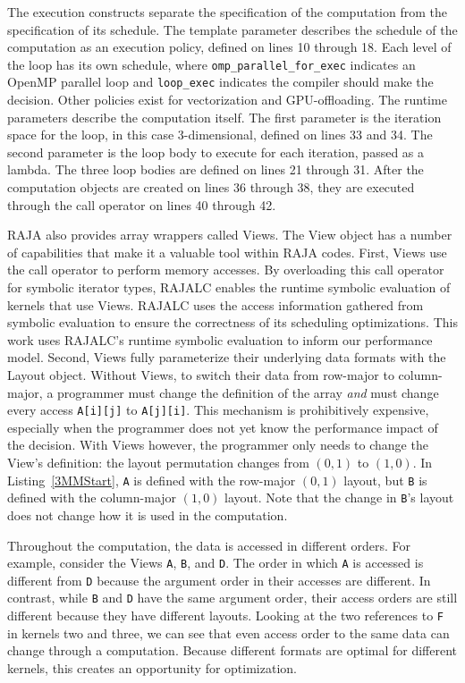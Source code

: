 \documentclass[sigconf,review=true]{acmart}
\begin{document}
The execution constructs separate the specification of the computation from the specification of its schedule.
The template parameter describes the schedule of the computation as an execution policy, defined on lines 10 through 18.
Each level of the loop has its own schedule, where \verb.omp_parallel_for_exec. indicates an OpenMP parallel loop and \verb.loop_exec. indicates the compiler should make the decision.
Other policies exist for vectorization and GPU-offloading.
The runtime parameters describe the computation itself. 
The first parameter is the iteration space for the loop, in this case 3-dimensional, defined on lines 33 and 34. 
The second parameter is the loop body to execute for each iteration, passed as a lambda.
The three loop bodies are defined on lines 21 through 31.
After the computation objects are created on lines 36 through 38, they are executed through the call operator on lines 40 through 42.

RAJA also provides array wrappers called Views.
The View object has a number of capabilities that make it a valuable tool within RAJA codes.
First, Views use the call operator to perform memory accesses. 
By overloading this call operator for symbolic iterator types, RAJALC enables the runtime symbolic evaluation of kernels that use Views.
RAJALC uses the access information gathered from symbolic evaluation to ensure the correctness of its scheduling optimizations.
This work uses RAJALC's runtime symbolic evaluation to inform our performance model.
Second, Views fully parameterize their underlying data formats with the Layout object.
Without Views, to switch their data from row-major to column-major, a programmer must change the definition of the array \textit{and} must change every access \verb.A[i][j]. to \verb.A[j][i]..
This mechanism is prohibitively expensive, especially when the programmer does not yet know the performance impact of the decision.
With Views however, the programmer only needs to change the View's definition: the layout permutation changes from $(0,1)$ to $(1,0)$. 
In Listing~\ref{3MMStart}, \verb.A. is defined with the row-major $(0,1)$ layout, but \verb.B. is defined with the column-major $(1,0)$ layout. 
Note that the change in \verb.B.'s layout does not change how it is used in the computation. 

Throughout the computation, the data is accessed in different orders.
For example, consider the Views \verb.A., \verb.B., and \verb.D..
The order in which \verb.A. is accessed is different from \verb.D. because the argument order in their accesses are different.
In contrast, while \verb.B. and \verb.D. have the same argument order, their access orders are still different because they have different layouts.
Looking at the two references to \verb.F. in kernels two and three, we can see that even access order to the same data can change through a computation.
Because different formats are optimal for different kernels, this creates an opportunity for optimization. 
\end{document}
